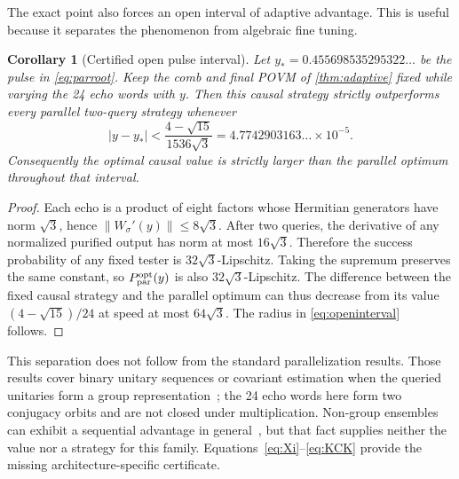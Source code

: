 \documentclass[11pt]{article}
\newtheorem{corollary}[theorem]{Corollary}
\theoremstyle{definition}
\begin{document}
The exact point also forces an open interval of adaptive advantage.  This is
useful because it separates the phenomenon from algebraic fine tuning.

\begin{corollary}[Certified open pulse interval]\label{cor:open}
Let $y_*=0.455698535295322\ldots$ be the pulse in \cref{eq:parroot}.  Keep the
comb and final POVM of \cref{thm:adaptive} fixed while varying the 24 echo
words with $y$.  Then this causal strategy strictly outperforms every
parallel two-query strategy whenever
\begin{equation}\label{eq:openinterval}
 |y-y_*|<\frac{4-\sqrt{15}}{1536\sqrt3}
 =4.7742903163\ldots\times10^{-5}.
\end{equation}
Consequently the optimal causal value is strictly larger than the parallel
optimum throughout that interval.
\end{corollary}

\begin{proof}
Each echo is a product of eight factors whose Hermitian generators have norm
$\sqrt3$, hence $\lVert W_\sigma'(y)\rVert\le8\sqrt3$.  After two queries,
the derivative of any normalized purified output has norm at most
$16\sqrt3$.  Therefore the success probability of any fixed tester is
$32\sqrt3$-Lipschitz.  Taking the supremum preserves the same constant, so
$P_{\rm par}^{\rm opt}(y)$ is also $32\sqrt3$-Lipschitz.  The difference
between the fixed causal strategy and the parallel optimum can thus decrease
from its value $(4-\sqrt{15})/24$ at speed at most $64\sqrt3$.  The radius in
\cref{eq:openinterval} follows.
\end{proof}

This separation does not follow from the standard parallelization results.
Those results cover binary unitary sequences or covariant estimation when the
queried unitaries form a group representation~\cite{chiribella2008}; the 24
echo words here form two conjugacy orbits and are not closed under
multiplication.  Non-group ensembles can exhibit a sequential advantage in
general~\cite{bavaresco2022}, but that fact supplies neither the value nor a
strategy for this family.  Equations~\eqref{eq:Xi}--\eqref{eq:KCK} provide the
missing architecture-specific certificate.
\end{document}
